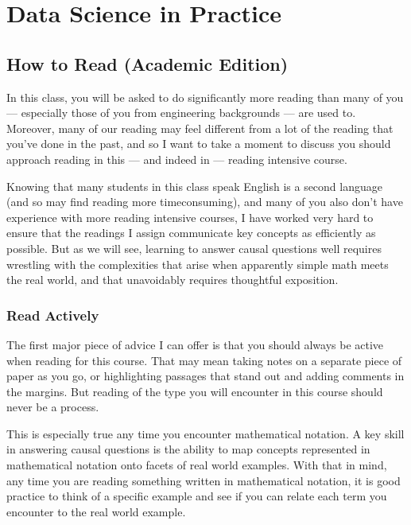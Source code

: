 \documentclass[letterpaper,10pt,english]{jupyterBook}
\begin{document}
\sphinxstepscope


\part{Data Science in Practice}

\sphinxstepscope


\chapter{How to Read (Academic Edition)}
\label{\detokenize{40_in_practice/00_how_to_read_this_book:how-to-read-academic-edition}}\label{\detokenize{40_in_practice/00_how_to_read_this_book::doc}}
\sphinxAtStartPar
In this class, you will be asked to do significantly more reading than many of you — especially those of you from engineering backgrounds — are used to. Moreover, many of our reading may feel different from a lot of the reading that you’ve done in the past, and so I want to take a moment to discuss  you should approach reading in this — and indeed in  — reading intensive course.

\sphinxAtStartPar
Knowing that many students in this class speak English is a second language (and so may find reading more time\sphinxhyphen{}consuming), and many of you also don’t have experience with more reading intensive courses, I have worked very hard to ensure that the readings I assign communicate key concepts as efficiently as possible. But as we will see, learning to answer causal questions well requires wrestling with the complexities that arise when apparently simple math meets the real world, and that unavoidably requires thoughtful exposition.


\section{Read Actively}
\label{\detokenize{40_in_practice/00_how_to_read_this_book:read-actively}}
\sphinxAtStartPar
The first major piece of advice I can offer is that you should always be active when reading for this course. That may mean taking notes on a separate piece of paper as you go, or highlighting passages that stand out and adding comments in the margins. But reading of the type you will encounter in this course should never be a  process.

\sphinxAtStartPar
This is especially true any time you encounter mathematical notation. A key skill in answering causal questions is the ability to map concepts represented in mathematical notation onto facets of real world examples. With that in mind, any time you are reading something written in mathematical notation, it is good practice to think of a specific example and see if you can relate each term you encounter to the real world example.
\end{document}
